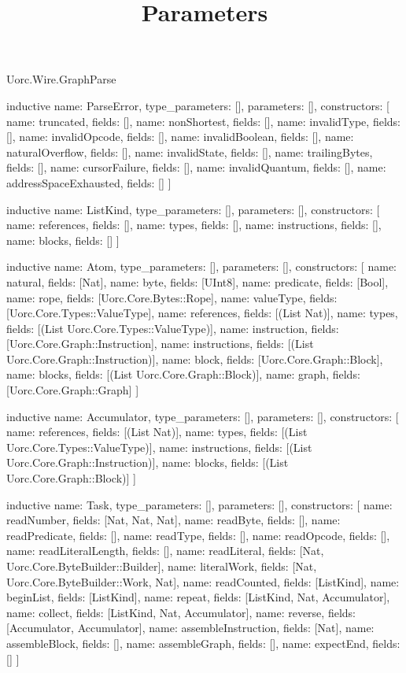 \begin{lexlean}{Uorc.Wire.GraphParse}
\title{Parameters}
\begin{semanticmodule}
inductive{
  name: ParseError,
  type_parameters: [],
  parameters: [],
  constructors: [
    {name: truncated, fields: []},
    {name: nonShortest, fields: []},
    {name: invalidType, fields: []},
    {name: invalidOpcode, fields: []},
    {name: invalidBoolean, fields: []},
    {name: naturalOverflow, fields: []},
    {name: invalidState, fields: []},
    {name: trailingBytes, fields: []},
    {name: cursorFailure, fields: []},
    {name: invalidQuantum, fields: []},
    {name: addressSpaceExhausted, fields: []}
  ]
}

inductive{
  name: ListKind,
  type_parameters: [],
  parameters: [],
  constructors: [
    {name: references, fields: []},
    {name: types, fields: []},
    {name: instructions, fields: []},
    {name: blocks, fields: []}
  ]
}

inductive{
  name: Atom,
  type_parameters: [],
  parameters: [],
  constructors: [
    {name: natural, fields: [Nat]},
    {name: byte, fields: [UInt8]},
    {name: predicate, fields: [Bool]},
    {name: rope, fields: [Uorc.Core.Bytes::Rope]},
    {name: valueType, fields: [Uorc.Core.Types::ValueType]},
    {name: references, fields: [(List Nat)]},
    {name: types, fields: [(List Uorc.Core.Types::ValueType)]},
    {name: instruction, fields: [Uorc.Core.Graph::Instruction]},
    {name: instructions, fields: [(List Uorc.Core.Graph::Instruction)]},
    {name: block, fields: [Uorc.Core.Graph::Block]},
    {name: blocks, fields: [(List Uorc.Core.Graph::Block)]},
    {name: graph, fields: [Uorc.Core.Graph::Graph]}
  ]
}

inductive{
  name: Accumulator,
  type_parameters: [],
  parameters: [],
  constructors: [
    {name: references, fields: [(List Nat)]},
    {name: types, fields: [(List Uorc.Core.Types::ValueType)]},
    {name: instructions, fields: [(List Uorc.Core.Graph::Instruction)]},
    {name: blocks, fields: [(List Uorc.Core.Graph::Block)]}
  ]
}

inductive{
  name: Task,
  type_parameters: [],
  parameters: [],
  constructors: [
    {name: readNumber, fields: [Nat, Nat, Nat]},
    {name: readByte, fields: []},
    {name: readPredicate, fields: []},
    {name: readType, fields: []},
    {name: readOpcode, fields: []},
    {name: readLiteralLength, fields: []},
    {name: readLiteral, fields: [Nat, Uorc.Core.ByteBuilder::Builder]},
    {name: literalWork, fields: [Nat, Uorc.Core.ByteBuilder::Work, Nat]},
    {name: readCounted, fields: [ListKind]},
    {name: beginList, fields: [ListKind]},
    {name: repeat, fields: [ListKind, Nat, Accumulator]},
    {name: collect, fields: [ListKind, Nat, Accumulator]},
    {name: reverse, fields: [Accumulator, Accumulator]},
    {name: assembleInstruction, fields: [Nat]},
    {name: assembleBlock, fields: []},
    {name: assembleGraph, fields: []},
    {name: expectEnd, fields: []}
  ]
}


\end{semanticmodule}
\end{lexlean}
